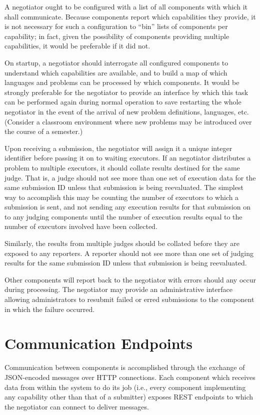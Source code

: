 \documentclass[11pt,letterpaper]{article}
\begin{document}
A negotiator ought to be configured with a list of all components with which it
shall communicate. Because components report which capabilities they provide,
it is not necessary for such a configuration to ``bin'' lists of components per
capability; in fact, given the possibility of components providing multiple
capabilities, it would be preferable if it did not.

On startup, a negotiator should interrogate all configured components to
understand which capabilities are available, and to build a map of which
languages and problems can be processed by which components. It would be
strongly preferable for the negotiator to provide an interface by which this
task can be performed again during normal operation to save restarting the
whole negotiator in the event of the arrival of new problem definitions,
languages, etc. (Consider a classroom environment where new problems may be
introduced over the course of a semester.)

Upon receiving a submission, the negotiator will assign it a unique integer
identifier before passing it on to waiting executors. If an negotiator
distributes a problem to multiple executors, it should collate results destined
for the same judge. That is, a judge should not see more than one set of
execution data for the same submission ID unless that submission is being
reevaluated. The simplest way to accomplish this may be counting the number of
executors to which a submission is sent, and not sending any execution results
for that submission on to any judging components until the number of execution
results equal to the number of executors involved have been collected.

Similarly, the results from multiple judges should be collated before they are
exposed to any reporters. A reporter should not see more than one set of
judging results for the same submission ID unless that submission is being
reevaluated.

Other components will report back to the negotiator with errors should any
occur during processing. The negotiator may provide an administrative interface
allowing administrators to resubmit failed or erred submissions to the
component in which the failure occurred.

\section{Communication Endpoints}
\label{endpoints}

Communication between components is accomplished through the exchange of
JSON-encoded messages over HTTP connections. Each component which receives data
from within the system to do its job (i.e., every component implementing any
capability other than that of a submitter) exposes REST endpoints to which the
negotiator can connect to deliver messages.
\end{document}

